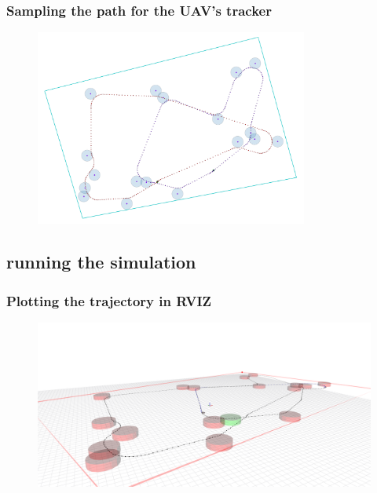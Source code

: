 \documentclass[aspectratio=1610]{beamer}
\begin{document}
  \begin{frame}
    \frametitle{Sampling the path for the UAV's tracker}

    \begin{figure}
      \includegraphics[width=0.8\textwidth]{fig/tsp_dubins_sampled.png}
    \end{figure}

  \end{frame}

  \subsection{running the simulation}


  \begin{frame}
    \frametitle{Plotting the trajectory in RVIZ}

    \begin{figure}
      \includegraphics[width=1.0\textwidth]{fig/rviz_1.png}
    \end{figure}

  \end{frame}
\end{document}
